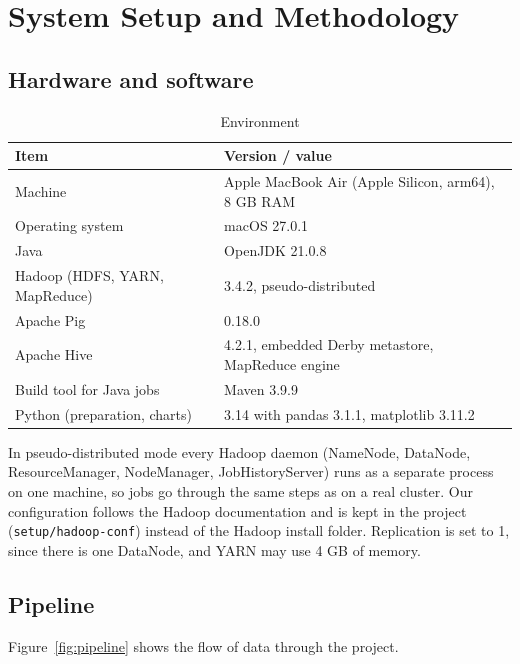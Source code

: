 \documentclass[12pt,a4paper]{report}
\begin{document}
\chapter{System Setup and Methodology}\label{ch:setup}

\section{Hardware and software}
\begin{table}[H]
\centering\small
\caption{Environment}\label{tab:env}
\begin{tabularx}{\textwidth}{lX}
\toprule
Item & Version / value\\
\midrule
Machine & Apple MacBook Air (Apple Silicon, arm64), 8 GB RAM\\
Operating system & macOS 27.0.1\\
Java & OpenJDK 21.0.8\\
Hadoop (HDFS, YARN, MapReduce) & 3.4.2, pseudo-distributed\\
Apache Pig & 0.18.0\\
Apache Hive & 4.2.1, embedded Derby metastore, MapReduce engine\\
Build tool for Java jobs & Maven 3.9.9\\
Python (preparation, charts) & 3.14 with pandas 3.1.1, matplotlib 3.11.2\\
\bottomrule
\end{tabularx}
\end{table}

In pseudo-distributed mode every Hadoop daemon (NameNode, DataNode, ResourceManager, NodeManager, JobHistoryServer) runs as a separate process on one machine, so jobs go through the same steps as on a real cluster. Our configuration follows the Hadoop documentation \cite{hadoopdocs} and is kept in the project (\texttt{setup/hadoop-conf}) instead of the Hadoop install folder. Replication is set to 1, since there is one DataNode, and YARN may use 4 GB of memory.

\section{Pipeline}
Figure~\ref{fig:pipeline} shows the flow of data through the project.
\end{document}
